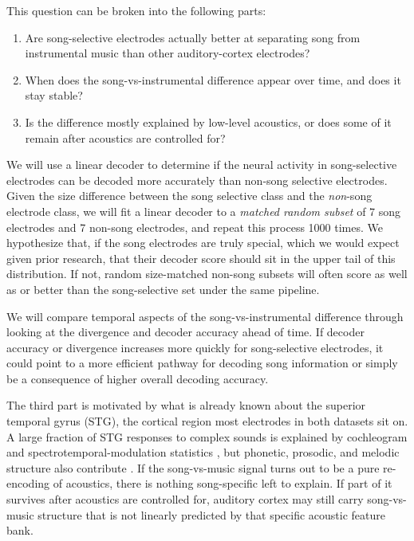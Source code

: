 \documentclass[11pt]{article}
\begin{document}
This question can be broken into the following parts:
\begin{enumerate}
\setlength{\itemsep}{0pt}
    \item {Are song-selective electrodes actually better at separating song from instrumental music than other auditory-cortex electrodes?}
    \item {When does the song-vs-instrumental difference appear over time, and does it stay stable?}
    \item {Is the difference mostly explained by low-level acoustics, or does some of it remain after acoustics are controlled for?}
\end{enumerate}

We will use a linear decoder to determine if the neural activity in song-selective electrodes can be decoded more accurately than non-song selective electrodes. Given the size difference between the song selective class and the  \emph{non}-song electrode class, we will fit a linear decoder to a \emph{matched random subset} of 7 song electrodes and 7 non-song electrodes, and repeat this process 1000 times. We hypothesize that, if the song electrodes are truly special, which we would expect given prior research, that their decoder score should sit in the upper tail of this distribution. If not, random size-matched non-song subsets will often score as well as or better than the song-selective set under the same pipeline.

We will compare temporal aspects of the song-vs-instrumental difference through looking at the divergence and decoder accuracy ahead of time. If decoder accuracy or divergence increases more quickly for song-selective electrodes, it could point to a more efficient pathway for decoding song information or simply be a consequence of higher overall decoding accuracy.

The third part is motivated by what is already known about the superior temporal gyrus (STG), the cortical region most electrodes in both datasets sit on. A large fraction of STG responses to complex sounds is explained by cochleogram and spectrotemporal-modulation statistics \citep{Mesgarani2014,Hullett2016,Hamilton2018}, but phonetic, prosodic, and melodic structure also contribute \citep{Yi2019,Sankaran2024,Leonard2024}. If the song-vs-music signal turns out to be a pure re-encoding of acoustics, there is nothing song-specific left to explain. If part of it survives after acoustics are controlled for, auditory cortex may still carry song-vs-music structure that is not linearly predicted by that specific acoustic feature bank.
\end{document}
